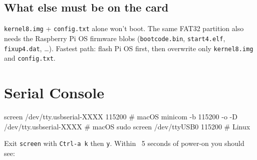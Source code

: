 \documentclass[a4paper,11pt]{article}
\begin{document}
\subsection{What else must be on the card}
\verb|kernel8.img| + \verb|config.txt| alone won't boot. The same FAT32
partition also needs the Raspberry Pi OS firmware blobs (\verb|bootcode.bin|,
\verb|start4.elf|, \verb|fixup4.dat|, \dots). Fastest path: flash Pi OS first,
then overwrite only \verb|kernel8.img| and \verb|config.txt|.

\section{Serial Console}
\begin{code}
screen /dev/tty.usbserial-XXXX 115200                       # macOS
minicom -b 115200 -o -D /dev/tty.usbserial-XXXX             # macOS
sudo screen /dev/ttyUSB0 115200                             # Linux
\end{code}
Exit \verb|screen| with \verb|Ctrl-a k| then \verb|y|. Within ~5 seconds of
power-on you should see:

\end{document}
